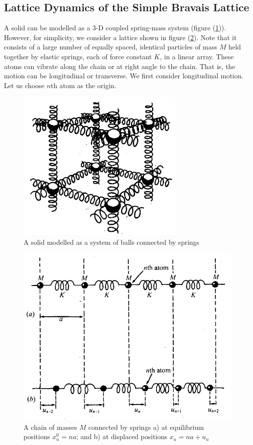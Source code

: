 \documentclass[%
 aip,
 amsmath,amssymb,
 reprint, floatfix%
]{revtex4-1}
\begin{document}
    \subsection{Lattice Dynamics of the Simple Bravais Lattice}
    A solid can be modelled as a 3-D coupled spring-mass system (figure (\ref{fig:ballsbyspring})). However, for simplicity, we consider a lattice shown in figure (\ref{fig:masschain}). Note that it consists of a large number of equally spaced, identical particles of mass $M$ held together by elastic springs, each of force constant $K$, in a linear array. These atoms can vibrate along the chain or at right angle to the chain. That is, the motion can be longitudinal or transverse. We first consider longitudinal motion. Let us choose $n$th atom as the origin.
    \begin{figure}
        \centering
        \includegraphics{Figures/ballsbyspring.png}
        \caption{A solid modelled as a system of balls connected by springs}
        \label{fig:ballsbyspring}
    \end{figure}
    \begin{figure}
        \centering
        \includegraphics[scale = 0.5]{Figures/chainofmasses.png}
        \caption{A chain of masses $M$ connected by springs a) at equilibrium positions $x_n^0 = na$; and b) at displaced positions $x_n = na + u_n$}
        \label{fig:masschain}
    \end{figure}
\end{document}

